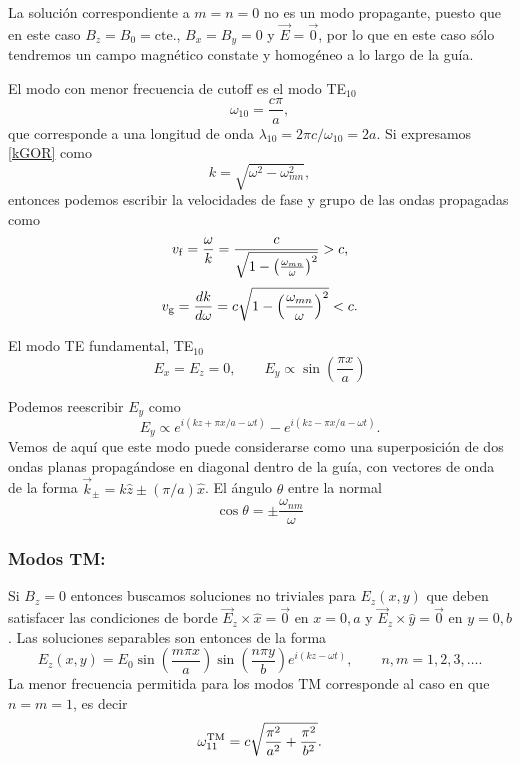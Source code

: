 La solución correspondiente a $m=n=0$ no es un modo propagante, puesto que en este caso $B_z=B_0=\text{cte.}$, $B_x=B_y=0$ y $\vec{E}=\vec{0}$, por lo que en este caso sólo tendremos un campo magnético constate y homogéneo a lo largo de la guía.

 El modo con menor frecuencia de cutoff es el modo TE$_{10}$
\begin{equation}
\omega_{10} = \frac{c \pi}{a},
\end{equation}
que corresponde a una longitud de onda $\lambda_{10}=2\pi c/\omega_{10}=2a$.
Si expresamos \eqref{kGOR} como
\begin{equation}
k = \sqrt{\omega^2 - \omega_{mn}^2},
\end{equation}
entonces podemos escribir la velocidades de fase y grupo de las ondas propagadas como
\begin{equation}
v_{\rm f} = \frac{\omega}{k} = \frac{c}{\sqrt{1 - \left(\frac{\omega_{mn}}{\omega}\right)^2}} > c,
\end{equation}
\begin{equation}
v_{\rm g} = \frac{dk}{d\omega} = c \sqrt{1 - \left(\frac{\omega_{mn}}{\omega}\right)^2} < c.
\end{equation}


El modo TE fundamental, TE$_{10}$
\begin{equation}
E_x=E_z=0, \qquad E_y \propto \sin\left(\frac{\pi x}{a}\right) 
\end{equation}

Podemos reescribir $E_y$ como
\begin{equation}
E_y\propto e^{i(kz+\pi x/a-\omega t)}-e^{i(kz-\pi x/a-\omega t)}.
\end{equation}
Vemos de aquí que este modo puede considerarse como una superposición de dos ondas planas propagándose en diagonal dentro de la guía, con vectores de onda de la forma $\vec{k}_\pm = k\hat{z}\pm(\pi /a)\hat{x}$. El ángulo $\theta$ entre la normal 
\begin{equation}
\cos\theta=\pm\frac{\omega_{nm}}{\omega}
\end{equation}


\subsubsection{Modos TM:}  Si $B_z=0$ entonces buscamos soluciones no triviales para $E_z(x,y)$ que deben satisfacer las condiciones de borde $\vec{E}_z\times\hat{x}=\vec{0}$ en $x=0,a$ y $\vec{E}_z\times\hat{y}=\vec{0}$ en $y=0,b$. Las soluciones separables son entonces de la forma
\begin{equation}
E_z(x, y) = E_0 \sin\left(\frac{m \pi x}{a}\right) \sin\left(\frac{n \pi y}{b}\right)e^{i(kz-\omega t)}, \qquad n,m=1,2,3,\dots.
\end{equation}
La menor frecuencia permitida para los modos TM corresponde al caso en que $n=m=1$, es decir
\begin{equation}
\omega^{\rm TM}_{11}=c\sqrt{\frac{\pi^2}{a^2}+\frac{\pi^2}{b^2}}.
\end{equation}

